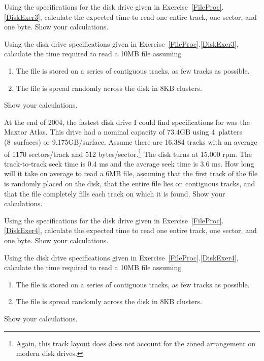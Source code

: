 \begin{exercises}
\item
Using the specifications for the disk drive given in
Exercise~\ref{FileProc}.\ref{DiskExer3}, calculate the expected time
to read one entire track, one sector, and one byte.
Show your calculations.

\item
Using the disk drive specifications given in
Exercise~\ref{FileProc}.\ref{DiskExer3},
calculate the time required to read a 10MB file assuming
\begin{enumerate}
\item The file is stored on a series of contiguous tracks, as few
tracks as possible.
\item The file is spread randomly across the disk in 8KB clusters.
\end{enumerate}
\noindent Show your calculations.

\item
\label{DiskExer4}
At the end of 2004, the fastest disk drive I could find specifications
for was the Maxtor Atlas.
This drive had a nominal capacity of 73.4GB using 4~platters
(8~surfaces) or 9.175GB/surface.
Assume there are 16,384 tracks with an average of 1170 sectors/track
and 512 bytes/sector.\footnote{Again, this track layout does does not
account for the zoned arrangement on modern disk drives.}
The disk turns at 15,000 rpm.
The track-to-track seek time is 0.4 ms and the average seek time is
3.6 ms.
How long will it take on average to read a 6MB file,
assuming that the first track of the file is randomly placed on the
disk, that the entire file lies on contiguous tracks, and that the file
completely fills each track on which it is found.
Show your calculations.

\item
Using the specifications for the disk drive given in
Exercise~\ref{FileProc}.\ref{DiskExer4}, calculate the expected time
to read one entire track, one sector, and one byte.
Show your calculations.

\item
Using the disk drive specifications given in
Exercise~\ref{FileProc}.\ref{DiskExer4},
calculate the time required to read a 10MB file assuming
\begin{enumerate}
\item The file is stored on a series of contiguous tracks, as few
tracks as possible.
\item The file is spread randomly across the disk in 8KB clusters.
\end{enumerate}
\noindent Show your calculations.


\end{exercises}
